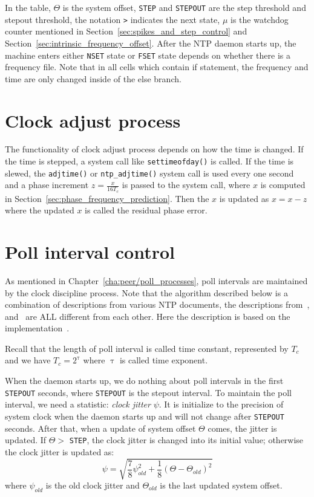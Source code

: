 In the table, $\Theta$ is the system offset, \verb|STEP| and \verb|STEPOUT| are
the step threshold and stepout threshold, the notation \verb|>| indicates the
next state, $\mu$ is the watchdog counter mentioned in
Section~\ref{sec:spikes_and_step_control} and
Section~\ref{sec:intrinsic_frequency_offset}. After the NTP daemon starts up,
the machine enters either \verb|NSET| state or \verb|FSET| state depends on
whether there is a frequency file. Note that in all cells which contain if
statement, the frequency and time are only changed inside of the else branch.

\section{Clock adjust process}%
\label{sec:clock_adjust_process}
The functionality of clock adjust process depends on how the time is changed.
If the time is stepped, a system call like \verb|settimeofday()| is called. If
the time is slewed, the \verb|adjtime()| or \verb|ntp_adjtime()| system call is
used every one second and a phase increment $z=\frac{x}{16T_c}$ is passed to
the system call, where $x$ is computed in
Section~\ref{sec:phase_frequency_prediction}. Then the $x$ is updated as
$x=x-z$ where the updated $x$ is called the residual phase error.

\section{Poll interval control}%
\label{sec:poll_interval_control}
As mentioned in Chapter~\ref{cha:peer/poll_processes}, poll intervals are
maintained by the clock discipline process. Note that the algorithm described
below is a combination of descriptions from various NTP documents, the
descriptions from~\cite{redbook}, \cite{poll_process} and~\cite{rfc5905} are
ALL different from each other. Here the description is based on the
implementation~\cite{source_code}.

Recall that the length of poll interval is called time constant, represented by
$T_c$ and we have $T_c = 2^\uptau$ where $\uptau$ is called time exponent.

When the daemon starts up, we do nothing about poll intervals in the first
\verb|STEPOUT| seconds, where \verb|STEPOUT| is the stepout interval.
To maintain the poll interval, we need a statistic: \emph{clock jitter} $\psi$.
It is initialize to the precision of system clock when the daemon starts up and
will not change after \verb|STEPOUT| seconds. After that, when a update of
system offset $\Theta$ comes, the jitter is updated. If $\Theta > $
\verb|STEP|, the clock jitter is changed into its initial value; otherwise the
clock jitter is updated as:
\begin{equation}
    \psi = \sqrt{ \frac{7}{8}\psi_{old}^2 + \frac{1}{8}\left(\Theta -
    \Theta_{old}\right)^2 }
    \label{eq:clock_jitter}
\end{equation}
where $\psi_{old}$ is the old clock jitter and $\Theta_{old}$ is the last
updated system offset. 


